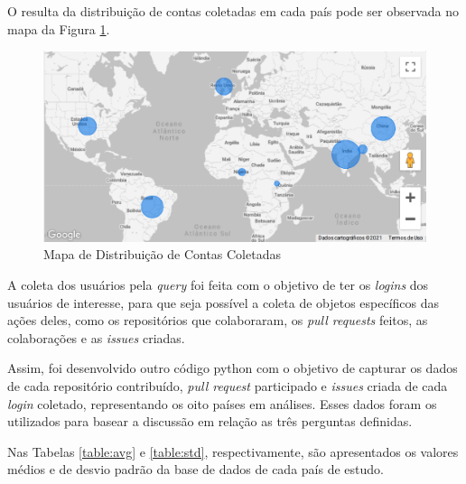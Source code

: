 \documentclass[12pt]{article}
\begin{document}
O resulta da distribuição de contas coletadas em cada país pode ser observada no mapa da Figura \ref{fig:map}.

\begin{figure}[H]
\centering
\includegraphics[width=1\textwidth]{img/met/map.png}
\caption{Mapa de Distribuição de Contas Coletadas}
\label{fig:map}
\end{figure}

A coleta dos usuários pela \emph{query} foi feita com o objetivo de ter os \emph{logins} dos usuários de interesse, para que seja possível a coleta de objetos específicos das ações deles, como os repositórios que colaboraram, os \emph{pull requests} feitos, as colaborações e as \emph{issues} criadas. 

Assim, foi desenvolvido outro código python com o objetivo de capturar os dados de cada repositório contribuído, \emph{pull request} participado e  \emph{issues} criada de cada \emph{login} coletado, representando os oito países em análises. Esses dados foram os utilizados para basear a discussão em relação as três perguntas definidas.

Nas Tabelas \ref{table:avg} e \ref{table:std}, respectivamente, são apresentados os valores médios e de desvio padrão da base de dados de cada país de estudo.
\end{document}
